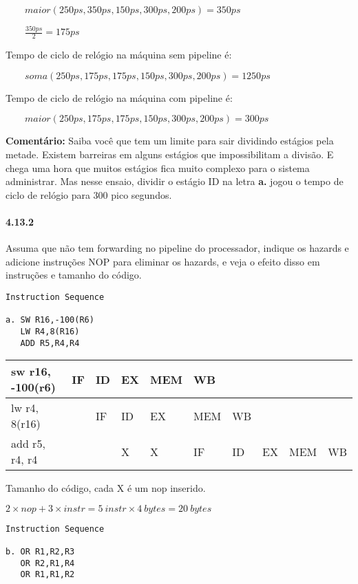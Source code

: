 \documentclass{article}
\begin{document}
$\qquad maior(250ps, 350ps, 150ps, 300ps, 200ps) = 350ps$

$\qquad \frac{350ps}{2} = 175ps$

Tempo de ciclo de relógio na máquina sem pipeline é:

$\qquad soma(250ps,175ps,175ps,150ps,300ps,200ps) = 1250ps$

Tempo de ciclo de relógio na máquina com pipeline é:

$\qquad maior(250ps, 175ps, 175ps, 150ps, 300ps, 200ps) = 300ps$

\textbf{Comentário:} Saiba você que tem um limite para sair dividindo estágios
pela metade. Existem barreiras em alguns estágios que impossibilitam a divisão.
E chega uma hora que muitos estágios fica muito complexo para o sistema
administrar. Mas nesse ensaio, dividir o estágio ID na letra \textbf{a.} jogou o
tempo de ciclo de relógio para 300 pico segundos.

\paragraph{4.13.2} Assuma que não tem forwarding no pipeline do processador, 
indique os hazards e adicione instruções NOP para eliminar os hazards, e veja o 
efeito disso em instruções e tamanho do código.

\begin{verbatim}
Instruction Sequence

a. SW R16,-100(R6)
   LW R4,8(R16)
   ADD R5,R4,R4
\end{verbatim}

\begin{tabular}{|l|l|l|l|l|l|l|l|l|l|}
\hline sw r16, -100(r6) & IF& ID& EX& MEM&  WB&   &   &    &   \\
\hline lw r4, 8(r16)    &   & IF& ID&  EX& MEM& WB&   &    &   \\
\hline add r5, r4, r4   &   &   &  X&   X&  IF& ID& EX& MEM& WB\\
\hline
\end{tabular}

Tamanho do código, cada X é um nop inserido.

$2 \times nop + 3 \times instr = 5\ instr \times 4\ bytes = 20\ bytes$

\begin{verbatim}
Instruction Sequence

b. OR R1,R2,R3
   OR R2,R1,R4
   OR R1,R1,R2
\end{verbatim}
\end{document}
